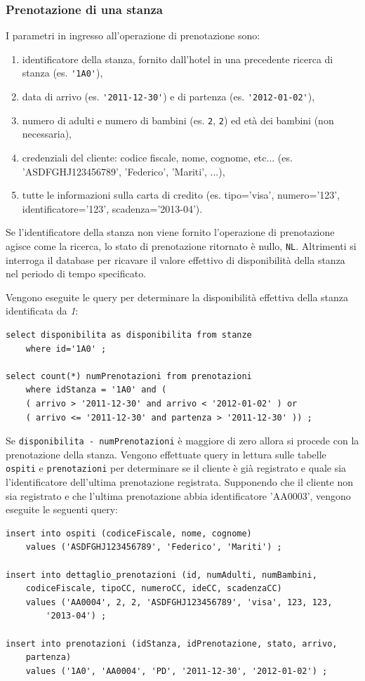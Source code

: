 \documentclass[a4paper]{article}
\begin{document}
\subsubsection{Prenotazione di una stanza}
I parametri in ingresso all'operazione di prenotazione sono:
\begin{enumerate}
\item identificatore della stanza, fornito dall'hotel in una
  precedente ricerca di stanza (es. \verb+'1A0'+),
\item data di arrivo (es. \verb+'2011-12-30'+) e di partenza
  (es. \verb+'2012-01-02'+),
\item numero di adulti e numero di bambini (es. \verb+2+, \verb+2+) ed
  et\`a dei bambini (non necessaria),
\item credenziali del cliente: codice fiscale, nome, cognome,
  etc... (es. 'ASDFGHJ123456789', 'Federico', 'Mariti', ...),
\item tutte le informazioni sulla carta di credito (es. tipo='visa',
  numero='123', identificatore='123', scadenza='2013-04').
\end{enumerate}
Se l'identificatore della stanza non viene fornito l'operazione di
prenotazione agisce come la ricerca, lo stato di prenotazione
ritornato \`e nullo, \verb+NL+. Altrimenti si interroga il database
per ricavare il valore effettivo di disponibilit\`a della stanza nel
periodo di tempo specificato. 

Vengono eseguite le query per determinare la disponibilit\`a effettiva
della stanza identificata da \emph{1}:
\begin{lstlisting}
select disponibilita as disponibilita from stanze
    where id='1A0' ;

select count(*) numPrenotazioni from prenotazioni
    where idStanza = '1A0' and (
    ( arrivo > '2011-12-30' and arrivo < '2012-01-02' ) or
    ( arrivo <= '2011-12-30' and partenza > '2011-12-30' )) ;
\end{lstlisting}
Se \verb+disponibilita - numPrenotazioni+ \`e maggiore di zero allora
si procede con la prenotazione della stanza. Vengono effettuate query
in lettura sulle tabelle \verb'ospiti' e \verb'prenotazioni' per
determinare se il cliente \`e gi\`a registrato e quale sia
l'identificatore dell'ultima prenotazione registrata. Supponendo che
il cliente non sia registrato e che l'ultima prenotazione abbia
identificatore 'AA0003', vengono eseguite le seguenti query:
\begin{lstlisting}
insert into ospiti (codiceFiscale, nome, cognome) 
    values ('ASDFGHJ123456789', 'Federico', 'Mariti') ;

insert into dettaglio_prenotazioni (id, numAdulti, numBambini,
    codiceFiscale, tipoCC, numeroCC, ideCC, scadenzaCC) 
    values ('AA0004', 2, 2, 'ASDFGHJ123456789', 'visa', 123, 123,
        '2013-04') ;

insert into prenotazioni (idStanza, idPrenotazione, stato, arrivo,
    partenza)
    values ('1A0', 'AA0004', 'PD', '2011-12-30', '2012-01-02') ;
\end{lstlisting}
\end{document}

